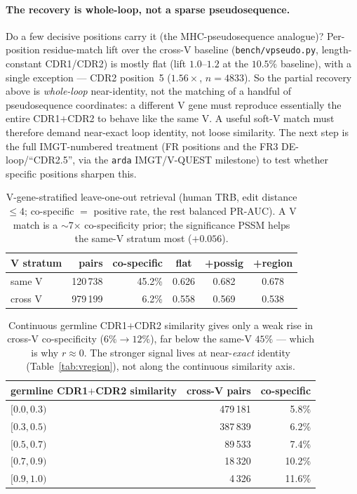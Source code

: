 \documentclass[11pt]{article}
\theoremstyle{oldplain}
\theoremstyle{oldrem}
\begin{document}
\paragraph{The recovery is whole-loop, not a sparse pseudosequence.} Do a few decisive positions carry
it (the MHC-pseudosequence analogue)? Per-position residue-match lift over the cross-V baseline
(\texttt{bench/vpseudo.py}, length-constant CDR1/CDR2) is mostly flat (lift $1.0$--$1.2$ at the $10.5\%$
baseline), with a single exception --- CDR2 position~5 ($1.56\times$, $n=4833$). So the partial recovery
above is \emph{whole-loop} near-identity, not the matching of a handful of pseudosequence coordinates:
a different V gene must reproduce essentially the entire CDR1$+$CDR2 to behave like the same V. A useful
soft-V match must therefore demand near-exact loop identity, not loose similarity. The next step is the
full IMGT-numbered treatment (FR positions and the FR3 DE-loop/``CDR2.5'', via the \texttt{arda}
IMGT/V-QUEST milestone) to test whether specific positions sharpen this.

\begin{table}[ht]\centering\small
\begin{tabular}{lrrccc}
\hline
V stratum & pairs & co-specific & flat & +possig & +region\\
\hline
same V  & 120\,738 & 45.2\% & 0.626 & 0.682 & 0.678\\
cross V & 979\,199 &  6.2\% & 0.558 & 0.569 & 0.538\\
\hline
\end{tabular}
\caption{V-gene-stratified leave-one-out retrieval (human TRB, edit distance $\le4$; co-specific $=$
positive rate, the rest balanced PR-AUC). A V match is a $\sim$7$\times$ co-specificity prior; the
significance PSSM helps the same-V stratum most ($+0.056$).}
\label{tab:vgene}
\end{table}

\begin{table}[ht]\centering\small
\begin{tabular}{lrr}
\hline
germline CDR1$+$CDR2 similarity & cross-V pairs & co-specific\\
\hline
$[0.0,0.3)$ & 479\,181 &  5.8\%\\
$[0.3,0.5)$ & 387\,839 &  6.2\%\\
$[0.5,0.7)$ &  89\,533 &  7.4\%\\
$[0.7,0.9)$ &  18\,320 & 10.2\%\\
$[0.9,1.0)$ &   4\,326 & 11.6\%\\
\hline
\end{tabular}
\caption{Continuous germline CDR1$+$CDR2 similarity gives only a weak rise in cross-V co-specificity
($6\%\!\to\!12\%$), far below the same-V $45\%$ --- which is why $r\approx0$. The stronger signal lives
at near-\emph{exact} identity (Table~\ref{tab:vregion}), not along the continuous similarity axis.}
\label{tab:vgene-sim}
\end{table}
\end{document}
